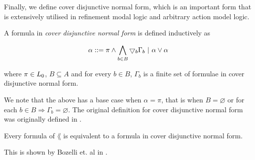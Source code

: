 %

Finally, we define cover disjunctive normal form, which is an important form that is extensively utilised in
refinement modal logic and arbitrary action model logic.

\begin{defn} \label{coverNormal}
	A formula in {\em cover disjunctive normal form} is defined inductively as

\[
	\alpha ::= \pi \land \bigwedge_{b \in B} \bigtriangledown_b \Gamma_b \text{ } | \text{ } \alpha \lor \alpha
\]

where $\pi \in L_0$, $B \subseteq A$ and for every $b \in B$, $\Gamma_b$ is a finite set of
formulae in cover disjunctive normal form.
\end{defn}

We note that the above has a base case when $\alpha = \pi$, that is when $B = \varnothing$ or for
each $b \in B \Rightarrow \Gamma_b = \varnothing$.
The original definition for cover disjunctive normal form was originally defined in
\cite{van2010future}.

\begin{lemma} \label{allInCoverNormal}
Every formula of $\lang$ is equivalent to a formula in cover disjunctive normal form.
\end{lemma}

This is shown by Bozelli et. al in \cite{DBLPjournalscorrabs12023538}.
